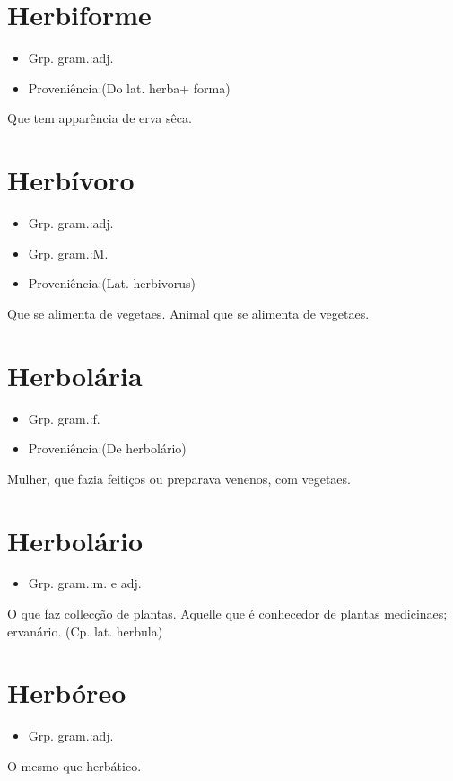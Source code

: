 \documentclass{article}
\begin{document}
\section{Herbiforme}
\begin{itemize}
\item {Grp. gram.:adj.}
\end{itemize}
\begin{itemize}
\item {Proveniência:(Do lat. \textunderscore herba\textunderscore  + \textunderscore forma\textunderscore )}
\end{itemize}
Que tem apparência de erva sêca.
\section{Herbívoro}
\begin{itemize}
\item {Grp. gram.:adj.}
\end{itemize}
\begin{itemize}
\item {Grp. gram.:M.}
\end{itemize}
\begin{itemize}
\item {Proveniência:(Lat. \textunderscore herbivorus\textunderscore )}
\end{itemize}
Que se alimenta de vegetaes.
Animal que se alimenta de vegetaes.
\section{Herbolária}
\begin{itemize}
\item {Grp. gram.:f.}
\end{itemize}
\begin{itemize}
\item {Proveniência:(De \textunderscore herbolário\textunderscore )}
\end{itemize}
Mulher, que fazia feitiços ou preparava venenos, com vegetaes.
\section{Herbolário}
\begin{itemize}
\item {Grp. gram.:m.  e  adj.}
\end{itemize}
O que faz collecção de plantas.
Aquelle que é conhecedor de plantas medicinaes; ervanário.
(Cp. lat. \textunderscore herbula\textunderscore )
\section{Herbóreo}
\begin{itemize}
\item {Grp. gram.:adj.}
\end{itemize}
O mesmo que \textunderscore herbático\textunderscore .
\end{document}
